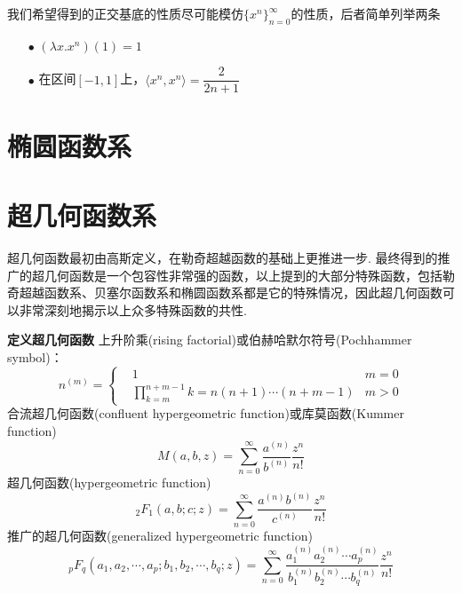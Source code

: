 \documentclass[UTF8]{ctexart}
\newenvironment{definition}[1]
    {\begin{tcolorbox}[enhanced, colback=LightYellow, breakable=false, frame hidden, borderline west={1.5mm}{-2mm}{DarkGreen}]
    {\bfseries {\color{DarkGreen} 定义}\quad #1} \newline}
    {\end{tcolorbox}}
\begin{document}
我们希望得到的正交基底的性质尽可能模仿\(\{x^n\}_{n=0}^{\infty}\)的性质，后者简单列举两条
\begin{itemize}
    \item [\(\bullet\)] \((\lambda x.x^n)(1) = 1\)
    \item [\(\bullet\)] 在区间\([-1,1]\)上，\(\langle x^n,x^n \rangle = \dfrac{2}{2n+1}\)
\end{itemize}

\section{椭圆函数系}

\section{超几何函数系}

超几何函数最初由高斯定义，在勒奇超越函数的基础上更推进一步. 最终得到的推广的超几何函数是一个包容性非常强的函数，以上提到的大部分特殊函数，包括勒奇超越函数系、贝塞尔函数系和椭圆函数系都是它的特殊情况，因此超几何函数可以非常深刻地揭示以上众多特殊函数的共性.

\begin{definition}{超几何函数}
    上升阶乘(rising factorial)或伯赫哈默尔符号(Pochhammer symbol)：
    \[n^{(m)} = \left\{\begin{aligned} &1 & m=0 \\ & \prod_{k=m}^{n+m-1}k = n(n+1)\cdots(n+m-1) & m > 0 \end{aligned}\right.\]
    合流超几何函数(confluent hypergeometric function)或库莫函数(Kummer function)
    \[M(a,b,z) = \sum_{n=0}^{\infty}\frac{a^{(n)}}{b^{(n)}}\frac{z^n}{n!}\]
    超几何函数(hypergeometric function)
    \[_2F_1(a,b;c;z) = \sum_{n=0}^{\infty}\frac{a^{(n)}b^{(n)}}{c^{(n)}}\frac{z^n}{n!}\]
    推广的超几何函数(generalized hypergeometric function)
    \[_pF_q(a_1, a_2, \cdots, a_p; b_1, b_2, \cdots, b_q;z) = \sum_{n=0}^{\infty}\frac{a_1^{(n)}a_2^{(n)}\cdots a_p^{(n)}}{b_1^{(n)}b_2^{(n)}\cdots b_q^{(n)}}\frac{z^n}{n!}\]
\end{definition}
\end{document}
